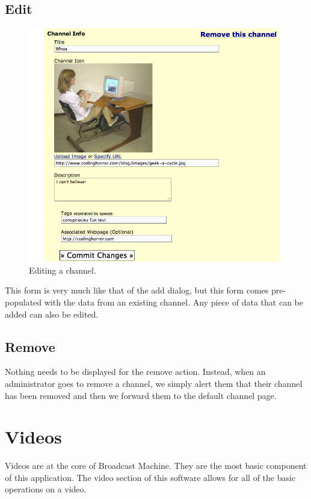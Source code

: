 \documentclass[a4paper,12pt]{report}
\begin{document}
\subsection{Edit}
\begin{figure}[h]
\begin{center}
\includegraphics[width=150mm]{./images/channeledit.png}
\end{center}
\caption{Editing a channel.}
\end{figure}

This form is very much like that of the add dialog, but this form comes pre-populated with the data from an existing channel.
Any piece of data that can be added can also be edited.

\subsection{Remove}
Nothing needs to be displayed for the remove action.
Instead, when an administrator goes to remove a channel, we simply alert them that their channel has been removed and then we forward them to the default channel page.

\section{Videos}
Videos are at the core of Broadcast Machine.
They are the most basic component of this application.
The video section of this software allows for all of the basic operations on a video.
\end{document}
